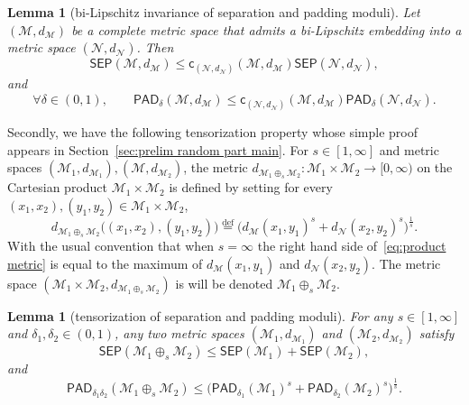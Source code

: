 \documentclass[11pt,reqno]{amsart}
\renewcommand{\le}{\leqslant}
\renewcommand{\d}{\delta}
\newcommand{\cc}{\mathsf{c}}
\newcommand{\NN}{\mathcal{N}}
\newtheorem{lemma}[theorem]{Lemma}
\theoremstyle{remark}
\newcommand{\MM}{\mathcal{M}}
\newcommand{\eqdef}{\stackrel{\mathrm{def}}{=}}
\renewcommand{\1}{\mathbf 1}
\newcommand{\sep}{\mathsf{SEP}}
\newcommand{\pad}{\mathsf{PAD}}
\begin{document}
\begin{lemma}[bi-Lipschitz invariance of separation and padding moduli]\label{lem:invariance} Let $(\MM,d_\MM)$ be a complete metric space that admits a bi-Lipschitz embedding into a metric space $(\NN,d_\NN)$. Then
\begin{equation}\label{eq:sep invariance}
\sep(\MM,d_\MM)\le \cc_{(\NN,d_\NN)}(\MM,d_\MM)\sep(\NN,d_\NN),
\end{equation}
and
\begin{equation}\label{eq:pad invariance}
\forall  \d\in (0,1),\qquad \pad_\d(\MM,d_\MM)\le \cc_{(\NN,d_\NN)}(\MM,d_\MM)\pad_\d(\NN,d_\NN).
\end{equation}
\end{lemma}

Secondly,  we have the following  tensorization property  whose simple proof appears in Section~\ref{sec:prelim random part main}. For $s\in [1,\infty]$ and  metric spaces $(\MM_1,d_{\MM_1}),(\MM,d_{\MM_2})$, the metric $d_{\MM_1\oplus_s\MM_2}:\MM_1\times \MM_2\to [0,\infty)$ on the Cartesian product $\MM_1\times \MM_2$ is defined by setting for every $(x_1,x_2),(y_1,y_2)\in \MM_1\times \MM_2$,
\begin{equation}\label{eq:product metric}
d_{\MM_1\oplus_s\MM_2}\big((x_1,x_2),(y_1,y_2)\big)\eqdef \big(d_\MM(x_1,y_1)^s+d_\NN(x_2,y_2)^s\big)^{\frac{1}{s}}.
\end{equation}
With the usual convention that when $s=\infty$ the right hand side of~\eqref{eq:product metric} is equal to the maximum of $d_\MM(x_1,y_1)$ and $d_\NN(x_2,y_2)$. The metric space $(\MM_1\times \MM_2,d_{\MM_1\oplus_s\MM_2})$ is will be denoted $\MM_1\oplus_s\MM_2$.
\begin{lemma}[tensorization of separation and padding moduli]\label{lem:tensorization} For any $s\in [1,\infty]$ and $\d_1,\d_2\in (0,1)$, any two metric spaces $(\MM_1,d_{\MM_1})$ and $(\MM_2,d_{\MM_2})$ satisfy
\begin{equation}\label{eq:sep subsadditive}
\sep(\MM_1\oplus_s \MM_2)\le  \sep(\MM_1)+\sep(\MM_2),
\end{equation}
and
\begin{equation}\label{eq:pad subadditive}
\pad_{\d_1\d_2}(\MM_1\oplus_s \MM_2)\le  \big(\pad_{\d_1}(\MM_1)^s+\pad_{\d_2}(\MM_2)^s\big)^{\frac{1}{s}}.
\end{equation}
\end{lemma}
\end{document}
